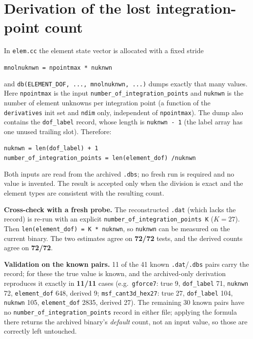 \documentclass[11pt,a4paper]{report}
\newcommand{\code}[1]{\texttt{#1}}
\begin{document}
\section*{Derivation of the lost integration-point count}

In \code{elem.cc} the element state vector is allocated with a fixed stride

\begin{center}
\code{mnolnuknwn = npointmax * nuknwn}
\end{center}

and \code{db(ELEMENT\_\allowbreak DOF, ..., mnolnuknwn, ...)} dumps exactly that many values.
Here \code{npointmax} is the input \code{number\_\allowbreak of\_\allowbreak integration\_\allowbreak points} and
\code{nuknwn} is the number of element unknowns per integration point (a
function of the \code{derivatives} init set and \code{ndim} only, independent of
\code{npointmax}). The dump also contains the \code{dof\_\allowbreak label} record, whose
length is \code{nuknwn - 1} (the label array has one unused trailing slot).
Therefore:

\begin{center}
\code{nuknwn = len(dof\_\allowbreak label) + 1}\\
\code{number\_\allowbreak of\_\allowbreak integration\_\allowbreak points = len(element\_\allowbreak dof) /\allowbreak  nuknwn}
\end{center}

Both inputs are read from the archived \code{.dbs}; no fresh run is required and
no value is invented. The result is accepted only when the division is exact and
the element types are consistent with the resulting count.

\textbf{Cross-check with a fresh probe.} The reconstructed \code{.dat} (which
lacks the record) is re-run with an explicit
\code{number\_\allowbreak of\_\allowbreak integration\_\allowbreak points K} ($K=27$). Then
\code{len(element\_\allowbreak dof) = K * nuknwn}, so \code{nuknwn} can be measured on the
current binary. The two estimates agree on \textbf{72/72} tests, and the derived
counts agree on \textbf{72/72}.

\textbf{Validation on the known pairs.} 11 of the 41 known \code{.dat}/\code{.dbs}
pairs carry the record; for these the true value is known, and the archived-only
derivation reproduces it exactly in \textbf{11/11} cases (e.g.\ \code{gforce7}:
true 9, \code{dof\_\allowbreak label} 71, \code{nuknwn} 72, \code{element\_\allowbreak dof} 648, derived 9;
\code{msf\_\allowbreak cant3d\_\allowbreak hex27}: true 27, \code{dof\_\allowbreak label} 104, \code{nuknwn} 105,
\code{element\_\allowbreak dof} 2835, derived 27). The remaining 30 known pairs have no
\code{number\_\allowbreak of\_\allowbreak integration\_\allowbreak points} record in either file; applying the formula
there returns the archived binary's \emph{default} count, not an input value, so
those are correctly left untouched.
\end{document}
